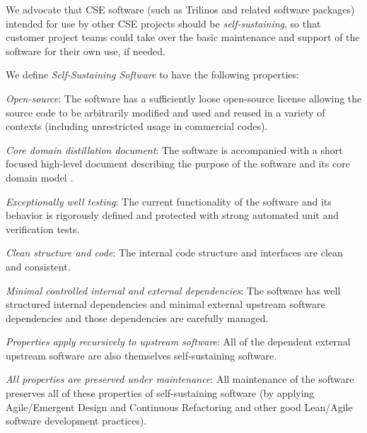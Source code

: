 \documentclass[11pt]{SANDreport}
\begin{document}
We advocate that CSE software (such as Trilinos and related software packages) intended for use by other CSE projects should be {}\textit{self-sustaining}, so that customer project teams could take over the basic maintenance and support of the software for their own use, if needed.

We define {}\textit{Self-Sustaining Software} to have the following properties:
%
\begin{compactitem}

{}\item\textit{Open-source}: The software has a sufficiently loose open-source license allowing the source code to be arbitrarily modified and used and reused in a variety of contexts (including unrestricted usage in commercial codes).

{}\item\textit{Core domain distillation document}: The software is accompanied with a short focused high-level document describing the purpose of the software and its core domain model {}\cite{DomainDrivenDesign}.

{}\item\textit{Exceptionally well testing}: The current functionality of the software and its behavior is rigorously defined and protected with strong automated unit and verification tests.

{}\item\textit{Clean structure and code}: The internal code structure and interfaces are clean and consistent.

{}\item\textit{Minimal controlled internal and external dependencies}: The software has well structured internal dependencies and minimal external upstream software dependencies and those dependencies are carefully managed.

{}\item\textit{Properties apply recursively to upstream software}: All of the dependent external upstream software are also themselves self-sustaining software.

{}\item\textit{All properties are preserved under maintenance}: All maintenance of the software preserves all of these properties of self-sustaining software (by applying Agile/Emergent Design and Continuous Refactoring and other good Lean/Agile software development practices).

\end{compactitem}
\end{document}

